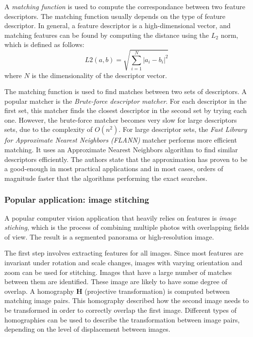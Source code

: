 A \textit{matching function} is used to compute the correspondance between two feature descriptors.
The matching function usually depends on the type of feature descriptor.
In general, a feature descriptor is a high-dimensional vector, and matching features can be found by computing the distance using the $L_2$ norm, which is defined as follows:
\begin{equation}
L2(a,b) =\sqrt { \sum_{i=1}^{N} \left| a_i - b_i \right| ^2 }
\end{equation}
where $N$ is the dimensionality of the descriptor vector.

The matching function is used to find matches between two sets of descriptors.
A popular matcher is the \textit{Brute-force descriptor matcher}. For each descriptor in the first set, this matcher finds the closest descriptor in the second set by trying each one.
However, the brute-force matcher becomes very slow for large descriptors sets, due to the complexity of $O(n^2)$.
For large descriptor sets, the \textit{Fast Library for Approximate Nearest Neighbors (FLANN)} \cite{muja2009flann} matcher performs more efficient matching.
It uses an Approximate Nearest Neighbors algorithm to find similar descriptors efficiently.
The authors state that the approximation has proven to be a good-enough in most practical applications and in most cases, orders of magnitude faster that the algorithms performing the exact searches.

\subsubsection{Popular application: image stitching}
A popular computer vision application that heavily relies on features is \textit{image stiching}, which is the process of combining multiple photos with overlapping fields of view.
The result is a segmented panorama or high-resolution image. 

The first step involves extracting features for all images.
Since most features are invariant under rotation and scale changes, images with varying orientation and zoom can be used for stitching.
Images that have a large number of matches between them are identified.
These image are likely to have some degree of overlap.
A homography $\boldsymbol{H}$ (projective transformation) is computed between matching image pairs.
This homography described how the second image needs to be transformed in order to correctly overlap the first image.
Different types of homographies can be used to describe the transformation between image pairs, depending on the level of displacement between images.

